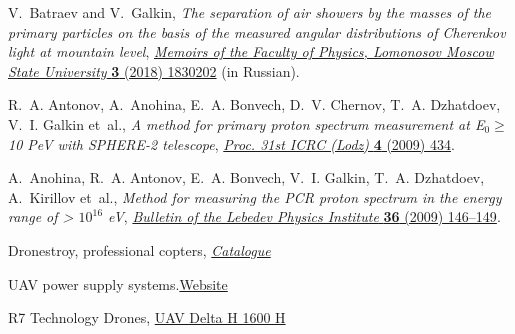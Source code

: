 \documentclass[a4paper,11pt]{article}
\begin{document}
\begin{thebibliography}{10}
V.~Batraev and V.~Galkin, \emph{The separation of air showers by the masses of the primary particles on the basis of the measured angular distributions of Cherenkov light at mountain level}, \href{http://uzmu.phys.msu.ru/file/2018/3/1830202.pdf}{\emph{Memoirs of the Faculty of Physics, Lomonosov Moscow State University} {\bfseries 3} (2018) 1830202} (in Russian).

R.~A. Antonov, A.~Anohina, E.~A. Bonvech, D.~V. Chernov, T.~A. Dzhatdoev, V.~I. Galkin et~al., \emph{A method for primary proton spectrum measurement at E$_0 \ge$ 10 PeV with SPHERE-2 telescope}, \href{https://galprop.stanford.edu/elibrary/icrc/2009/preliminary/pdf/icrc0434.pdf}{{\emph{{Proc. 31st ICRC (Lodz)}} {\bfseries 4} (2009) 434}}.

A.~Anohina, R.~A. Antonov, E.~A. Bonvech, V.~I. Galkin, T.~A. Dzhatdoev, A.~Kirillov et~al., \emph{Method for measuring the PCR proton spectrum in the energy range of > $10^{16}$ eV},
\href{http://dx.doi.org/10.3103/S1068335609050042}{\emph{Bulletin of the Lebedev Physics Institute} {\bfseries 36} (2009) 146--149}.

{Dronestroy, professional copters}, \href{https://dronestroy.ru/catalog}{\emph{Catalogue}}

{UAV power supply systems.}\href{http://atenergy.pro/en/products/energoobespechenie-bpla.html}{Website}

{R7 Technology Drones,} \href{http://r7dron.ru/}{UAV Delta H 1600 H}

\end{thebibliography}



\end{document}
